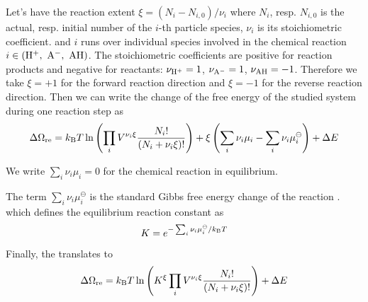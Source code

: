 \documentclass{elsarticle}
\begin{document}
Let's have the reaction extent $\xi = (N_i - N_{i,0})/\nu_i$
where $N_i$, resp. $N_{i,0}$ is the actual, resp. initial number of the $i$-th particle species,
$\nu_i$ is its stoichiometric coefficient.
and $i$ runs over individual species involved
in the chemical reaction  $i \in (\mathrm{H^+},\ \mathrm{A^-},\ \mathrm{AH})$. 
The stoichiometric coefficients are positive for reaction products
and negative for reactants: $\nu_{\mathrm{H^+}}=1$, $\nu_{\mathrm{A^-}}=1$, $\nu_{\mathrm{AH}}=-1$.
Therefore we take $\xi = +1$ for the forward reaction direction
and $\xi = -1$ for the reverse reaction direction.
Then we can write the change of the free energy of the studied system during one reaction step as
\begin{equation}
\Delta\Omega_{\mathrm{re}}=k_\mathrm{B}T\ln\left(\prod_i V^{\nu_i\xi}\frac{N_i!}{\left(N_i+\nu_i\xi\right)!}\right)+
\xi\left(\sum_i\nu_i\mu_i-\sum_i\nu_i\mu_i^\ominus\right)+\Delta E
\label{eq: DeltaG RE one}
\end{equation}

We write $\sum_i\nu_i \mu_i = 0$
for the chemical reaction in equilibrium.

The term $\sum_i\nu_i\mu_i^\ominus$ is the standard Gibbs free energy change
of the reaction .
which defines the equilibrium reaction constant \cite{Atkins} as
\begin{equation}
    K = e^{-\sum_i\nu_i \mu_i^\ominus / k_\mathrm{B}T}
\end{equation}

Finally, the  translates to
\begin{equation}
    \Delta\Omega_{\mathrm{re}}=k_\mathrm{B}T\ln\left(K^\xi\prod_i V^{\nu_i\xi}\frac{N_i!}{\left(N_i+\nu_i\xi\right)!}\right)+\Delta E
\label{eq: DeltaG RE two}
\end{equation}
\end{document}
